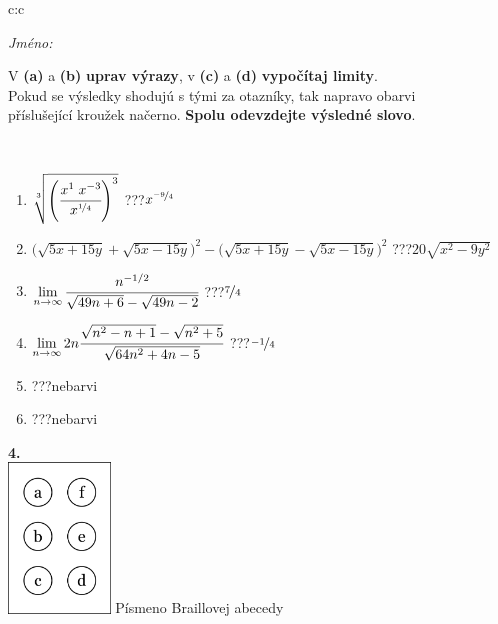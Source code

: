 \documentclass[10pt]{report}
\begin{document}
\begin{tabular}{c:c}
\begin{minipage}[c][104.5mm][t]{0.5\linewidth}
\begin{center}
\textit{Jméno:}\phantom{xxxxxxxxxxxxxxxxxxxxxxxxxxxxxxxxxxxxxxxxxxxxxxxxxxxxxxxxxxxxxxxxx}\\[5mm]
\begin{minipage}{0.95\linewidth}
\begin{center}
V \textbf{(a)} a \textbf{(b)} \textbf{uprav výrazy}, v \textbf{(c)} a \textbf{(d)} \textbf{vypočítaj limity}.\\Pokud se výsledky shodujú s tými za otazníky, tak napravo obarvi\\příslušející kroužek načerno. \textbf{Spolu odevzdejte výsledné slovo}.
\end{center}
\end{minipage}
\\[1mm]
\begin{minipage}{0.79\linewidth}
\begin{center}
\begin{varwidth}{\linewidth}
\begin{enumerate}
\small
\item $\sqrt[3]{\left(\cfrac{x^{1}\;x^{-3}}{x^{\nicefrac{1}{4}}}\right)^{3}}$\quad \dotfill\; ???\;\dotfill \quad $x^{\nicefrac{-9}{4}}$
\item {\footnotesize{\scriptsize$\big(\sqrt{5x+15y}+\sqrt{5x-15y}\big)^2-\big(\sqrt{5x+15y}-\sqrt{5x-15y}\big)^2$}\quad \dotfill\; ???\;\dotfill \quad $20\sqrt{x^2-9y^2}$}
\item $\lim\limits_{n\to\infty}\cfrac{n^{-1/2}}{\sqrt{49n+6}-\sqrt{49n-2}}$\quad \dotfill\; ???\;\dotfill \quad $\nicefrac{7}{4}$
\item $\lim\limits_{n\to\infty}2n\cfrac{\sqrt{n^2-n+1}-\sqrt{n^2+5}}{\sqrt{64n^2+4n-5}}$\quad \dotfill\; ???\;\dotfill \quad $\nicefrac{-1}{4}$
\item \quad \dotfill\; ???\;\dotfill \quad nebarvi
\item \quad \dotfill\; ???\;\dotfill \quad nebarvi
\end{enumerate}
\end{varwidth}
\end{center}
\end{minipage}
\begin{minipage}{0.20\linewidth}
\begin{center}
{\Huge\bfseries 4.} \\[2mm]
\includegraphics[height=40mm]{../images/braille.png}
{\small Písmeno Braillovej abecedy}
\end{center}
\end{minipage}
\end{center}
\end{minipage}
%
\end{tabular}
\end{document}
